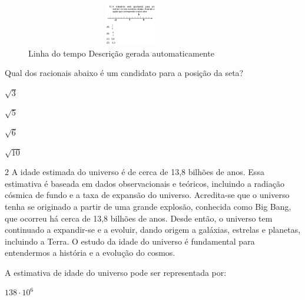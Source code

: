 \begin{escolha}
\begin{escolha}
\begin{escolha}
\begin{escolha}
{\begin{boxmedio}
\begin{boxpeq}
\begin{q°}
\begin{boxmedio}
\begin{boxpeq}
\begin{boxpeq}
\begin{boxmedio}
\begin{boxmedio}
\begin{boxmedio}
\begin{largebox}
\begin{boxmedio}
\begin{figure}
\centering
\includegraphics[width=3.60725in,height=0.70833in]{./_SAEB_9_MAT/media/image250.png}
\caption{Linha do tempo Descrição gerada automaticamente}
\end{figure}


Qual dos racionais abaixo é um candidato para a posição da seta?


\begin{escolha}

  \item $\sqrt{3}$

  \item $\sqrt{5}$

  \item $\sqrt{6}$

  \item $\sqrt{10}$


\end{escolha}


\num{2} A idade estimada do universo é de cerca de 13,8 bilhões de anos. Essa
estimativa é baseada em dados observacionais e teóricos, incluindo a
radiação cósmica de fundo e a taxa de expansão do universo.
Acredita-se que o universo tenha se originado a partir de uma grande
explosão, conhecida como Big Bang, que ocorreu há cerca de 13,8
bilhões de anos. Desde então, o universo tem continuado a expandir-se
e a evoluir, dando origem a galáxias, estrelas e planetas, incluindo a
Terra. O estudo da idade do universo é fundamental para entendermos a
história e a evolução do cosmos.

A estimativa de idade do universo pode ser representada por:

\begin{escolha}

\item $138 \cdot 10^{6}$


\end{escolha}
\end{boxmedio}
\end{largebox}
\end{boxmedio}
\end{boxmedio}
\end{boxmedio}
\end{boxpeq}
\end{boxpeq}
\end{boxmedio}
\end{q°}
\end{boxpeq}
\end{boxmedio}}
\end{escolha}
\end{escolha}
\end{escolha}
\end{escolha}
